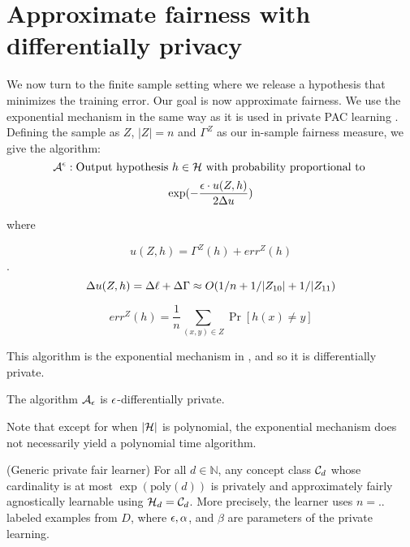 
\section{Approximate fairness with differentially privacy}



We now turn to the finite sample setting where we release a hypothesis
that minimizes the training error. Our goal is now approximate
fairness. We use the exponential mechanism in the same way as it is
used in private PAC learning \cite{Kasiviswanathan:2011:WLP:2078965.2078976}. 
Defining the sample as $Z$, $|Z| = n$ and
$\Gamma^{Z}$ as our in-sample fairness measure, we give the algorithm:
$$\mathcal{A}^\epsilon : \text{Output hypothesis }h \in \mathcal{H} \text{
	with probability proportional to }$$
\begin{align}
\exp(-\frac{\epsilon \cdot u(Z,h)}{2\Delta u})
\end{align}

where

$$u(Z,h) = \Gamma^Z(h) + err^Z(h)$$.
$$\Delta u(Z,h) = \Delta\ell + \Delta{\Gamma} \approx O(1/n+1/|Z_{10}|+1/|Z_{11})$$

$$err^Z(h) = \frac{1}{n} \sum_{(x,y) \in Z}\Pr[h(x) \neq y]$$



This algorithm is the exponential mechanism in \citet{McSherry:2007:MDV:1333875.1334185}, and so it is differentially private.

\begin{lemma}
	The algorithm $\mathcal{A}_\epsilon$ is $\epsilon$-differentially private.
\end{lemma}

Note that except for when $|\mathcal{H}|$ is polynomial, the exponential
mechanism does not necessarily yield a polynomial time algorithm.


\begin{theorem}
	(Generic private fair learner) For all $d \in \mathbb{N}$, any
	concept class $\mathcal{C}_d$ whose cardinality is at most
	$\exp(\text{poly}(d))$ is privately and approximately fairly
	agnostically learnable using $\mathcal{H}_d = \mathcal{C}_d$. More precisely, the
	learner uses $n = ..$ labeled examples from $D$, where $\epsilon,
	\alpha$, and $\beta$ are parameters of the private learning.
\end{theorem}

